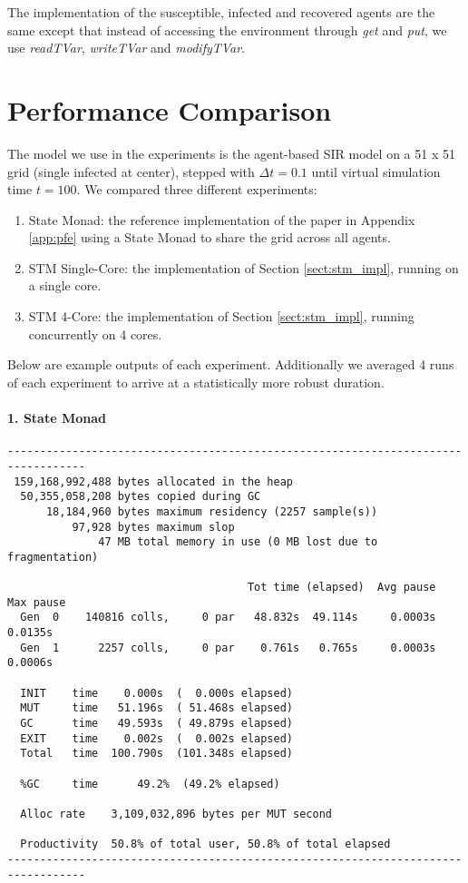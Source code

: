 The implementation of the susceptible, infected and recovered agents are the same except that instead of accessing the environment through \textit{get} and \textit{put}, we use \textit{readTVar}, \textit{writeTVar} and \textit{modifyTVar}.

\section{Performance Comparison}
\label{sect:stm_perf}
The model we use in the experiments is the agent-based SIR model on a 51 x 51 grid (single infected at center), stepped with $\Delta t = 0.1$ until virtual simulation time $t=100$. We compared three different experiments:

\begin{enumerate}
	\item State Monad: the reference implementation of the paper in Appendix \ref{app:pfe} using a State Monad to share the grid across all agents.
	\item STM Single-Core: the implementation of Section \ref{sect:stm_impl}, running on a single core.
	\item STM 4-Core: the implementation of Section \ref{sect:stm_impl}, running concurrently on 4 cores.
\end{enumerate}

Below are example outputs of each experiment. Additionally we averaged 4 runs of each experiment to arrive at a statistically more robust duration.

\paragraph{1. State Monad}
\begin{verbatim}
----------------------------------------------------------------------------------
 159,168,992,488 bytes allocated in the heap
  50,355,058,208 bytes copied during GC
      18,184,960 bytes maximum residency (2257 sample(s))
          97,928 bytes maximum slop
              47 MB total memory in use (0 MB lost due to fragmentation)

                                     Tot time (elapsed)  Avg pause  Max pause
  Gen  0    140816 colls,     0 par   48.832s  49.114s     0.0003s    0.0135s
  Gen  1      2257 colls,     0 par    0.761s   0.765s     0.0003s    0.0006s

  INIT    time    0.000s  (  0.000s elapsed)
  MUT     time   51.196s  ( 51.468s elapsed)
  GC      time   49.593s  ( 49.879s elapsed)
  EXIT    time    0.002s  (  0.002s elapsed)
  Total   time  100.790s  (101.348s elapsed)

  %GC     time      49.2%  (49.2% elapsed)

  Alloc rate    3,109,032,896 bytes per MUT second

  Productivity  50.8% of total user, 50.8% of total elapsed
----------------------------------------------------------------------------------
\end{verbatim}

